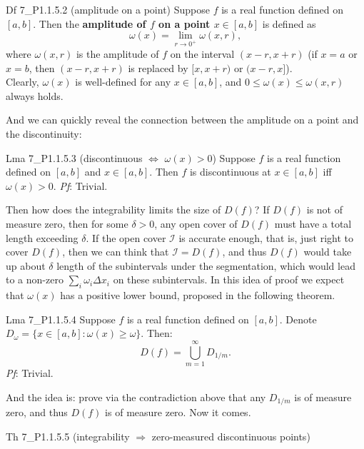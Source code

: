 \documentclass{article}
\begin{document}
\begin{Df}{Df 7\_P1.1.5.2 (amplitude on a point)}
    Suppose $f$ is a real function defined on $[a,b]$. Then the \textbf{amplitude of $f$ on a point $x\in [a,b]$} is defined as
    $$ \omega(x) = \lim\limits_{r\to 0^+} \omega(x, r), $$
    where $\omega(x, r)$ is the amplitude of $f$ on the interval $(x-r, x+r)$ (if $x=a$ or $x=b$, then $(x-r, x+r)$ is replaced by $[x, x+r)$ or $(x-r, x]$). \\
    \textcolor{Th}{Clearly, $\omega(x)$ is well-defined for any $x\in [a,b]$, and $0\leq\omega(x) \leq \omega (x,r)$ always holds.}
\end{Df}

And we can quickly reveal the connection between the amplitude on a point and the discontinuity:

\begin{Th}{Lma 7\_P1.1.5.3 (discontinuous $\Leftrightarrow$ $\omega(x) > 0$)}
    Suppose $f$ is a real function defined on $[a,b]$ and $x\in [a,b]$. Then $f$ is discontinuous at $x\in [a,b]$ iff $\omega(x) > 0$.
    \tcblower
    \textit{Pf}: Trivial.
\end{Th}

Then how does the integrability limits the size of $D(f)$? If $D(f)$ is not of measure zero, then for some $\delta>0$, any open cover of $D(f)$ must have a total length exceeding $\delta$. If the open cover $\mathcal{I}$ is accurate enough, that is, just right to cover $D(f)$, then we can think that $\mathcal{I} = D(f)$, and thus $D(f)$ would take up about $\delta$ length of the subintervals under the segmentation, which would lead to a non-zero $\sum_{i} \omega_i\Delta x_i$ on these subintervals. In this idea of proof we expect that $\omega(x)$ has a positive lower bound, proposed in the following theorem.

\begin{Th}{Lma 7\_P1.1.5.4}
    Suppose $f$ is a real function defined on $[a,b]$. Denote $D_{\omega} = \{x\in [a,b]: \omega(x)\geq \omega\}$. Then:
    $$ D(f) = \bigcup_{m=1}^{\infty} D_{1/m}. $$
    \tcblower
    \textit{Pf}: Trivial.
\end{Th}

And the idea is: prove via the contradiction above that any $D_{1/m}$ is of measure zero, and thus $D(f)$ is of measure zero. Now it comes.

\begin{Th}{Th 7\_P1.1.5.5 (integrability $\Rightarrow$ zero-measured discontinuous points)}
\end{Th}
\end{document}
